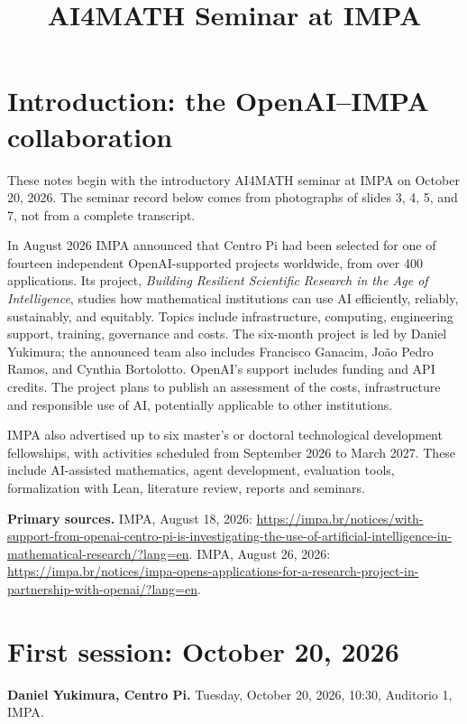 

\title{AI4MATH Seminar at IMPA}
\maketitle
\tableofcontents

\section{Introduction: the OpenAI--IMPA collaboration}
\label{section-ai4math-impa-partnership}
These notes begin with the introductory AI4MATH seminar at IMPA on
October 20, 2026. The seminar record below comes from photographs
of slides 3, 4, 5, and 7, not from a complete transcript.

In August 2026 IMPA announced that Centro Pi had been selected for
one of fourteen independent OpenAI-supported projects worldwide,
from over 400 applications. Its project,
\emph{Building Resilient Scientific Research in the Age of Intelligence},
studies how mathematical institutions can use AI efficiently, reliably,
sustainably, and equitably. Topics include infrastructure, computing,
engineering support, training, governance and costs. The six-month
project is led by Daniel Yukimura; the announced team also includes
Francisco Ganacim, Jo\~ao Pedro Ramos, and Cynthia Bortolotto.
OpenAI's support includes funding and API credits. The project plans
to publish an assessment of the costs, infrastructure and responsible
use of AI, potentially applicable to other institutions.

IMPA also advertised up to six master's or doctoral technological
development fellowships, with activities scheduled from September
2026 to March 2027. These include AI-assisted mathematics,
agent development, evaluation tools, formalization with Lean,
literature review, reports and seminars.

\medskip\noindent
\textbf{Primary sources.}
IMPA, August 18, 2026:
\url{https://impa.br/notices/with-support-from-openai-centro-pi-is-investigating-the-use-of-artificial-intelligence-in-mathematical-research/?lang=en}.
IMPA, August 26, 2026:
\url{https://impa.br/notices/impa-opens-applications-for-a-research-project-in-partnership-with-openai/?lang=en}.

\section{First session: October 20, 2026}
\label{section-ai4math-first-session}
\noindent\textbf{Daniel Yukimura, Centro Pi.} Tuesday, October 20, 2026, 10:30, Auditorio 1, IMPA.

